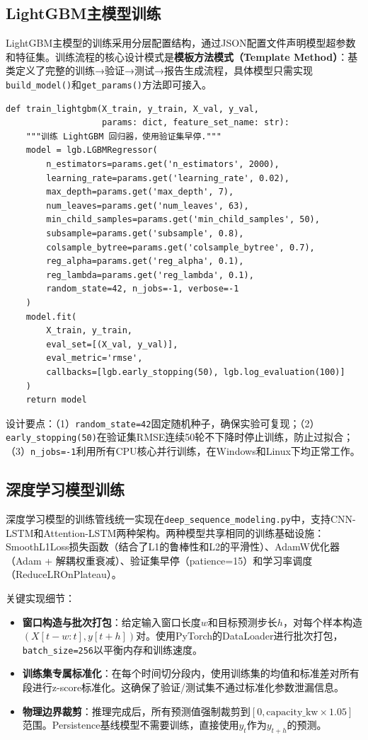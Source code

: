 \documentclass[12pt,a4paper]{ctexbook}
\begin{document}
\subsection{LightGBM主模型训练}

LightGBM主模型的训练采用分层配置结构，通过JSON配置文件声明模型超参数和特征集。训练流程的核心设计模式是\textbf{模板方法模式（Template Method）}：基类定义了完整的训练→验证→测试→报告生成流程，具体模型只需实现\texttt{build\_model()}和\texttt{get\_params()}方法即可接入。\cite{lightgbm-2017,design-patterns}

\begin{lstlisting}[caption={LightGBM模型训练关键代码（精简自 tabular\_comparison.py）}, label={lst:lgbm-train}]
def train_lightgbm(X_train, y_train, X_val, y_val,
                   params: dict, feature_set_name: str):
    """训练 LightGBM 回归器，使用验证集早停."""
    model = lgb.LGBMRegressor(
        n_estimators=params.get('n_estimators', 2000),
        learning_rate=params.get('learning_rate', 0.02),
        max_depth=params.get('max_depth', 7),
        num_leaves=params.get('num_leaves', 63),
        min_child_samples=params.get('min_child_samples', 50),
        subsample=params.get('subsample', 0.8),
        colsample_bytree=params.get('colsample_bytree', 0.7),
        reg_alpha=params.get('reg_alpha', 0.1),
        reg_lambda=params.get('reg_lambda', 0.1),
        random_state=42, n_jobs=-1, verbose=-1
    )
    model.fit(
        X_train, y_train,
        eval_set=[(X_val, y_val)],
        eval_metric='rmse',
        callbacks=[lgb.early_stopping(50), lgb.log_evaluation(100)]
    )
    return model
\end{lstlisting}

设计要点：（1）\texttt{random\_state=42}固定随机种子，确保实验可复现；（2）\texttt{early\_stopping(50)}在验证集RMSE连续50轮不下降时停止训练，防止过拟合；（3）\texttt{n\_jobs=-1}利用所有CPU核心并行训练，在Windows和Linux下均正常工作。

\subsection{深度学习模型训练}

深度学习模型的训练管线统一实现在\texttt{deep\_sequence\_modeling.py}中，支持CNN-LSTM和Attention-LSTM两种架构。两种模型共享相同的训练基础设施：SmoothL1Loss损失函数（结合了L1的鲁棒性和L2的平滑性）、AdamW优化器（Adam + 解耦权重衰减）、验证集早停（patience=15）和学习率调度（ReduceLROnPlateau）。

关键实现细节：
\begin{itemize}
  \item \textbf{窗口构造与批次打包}：给定输入窗口长度$w$和目标预测步长$h$，对每个样本构造$(X[t-w:t], y[t+h])$对。使用PyTorch的DataLoader进行批次打包，\texttt{batch\_size=256}以平衡内存和训练速度。
  \item \textbf{训练集专属标准化}：在每个时间切分段内，使用训练集的均值和标准差对所有段进行z-score标准化。这确保了验证/测试集不通过标准化参数泄漏信息。
  \item \textbf{物理边界裁剪}：推理完成后，所有预测值强制裁剪到$[0, \text{capacity\_kw} \times 1.05]$范围。Persistence基线模型不需要训练，直接使用$y_t$作为$y_{t+h}$的预测。
\end{itemize}
\end{document}
